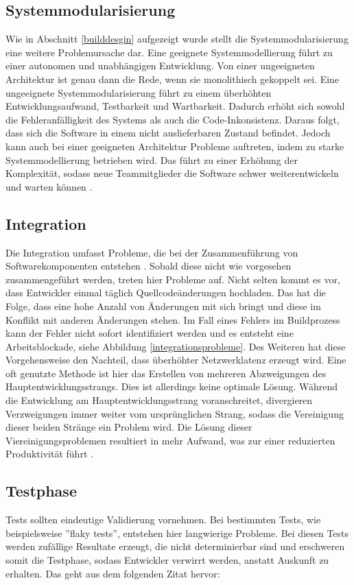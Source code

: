 \subsection{Systemmodularisierung}  \label{Systemmodularisierung}
Wie in Abschnitt \ref{builddesgin} aufgezeigt wurde stellt die Systemmodularisierung eine weitere Problemursache dar. Eine geeignete Systemmodellierung führt zu einer autonomen und unabhängigen Entwicklung. Von einer ungeeigneten Architektur ist genau dann die Rede, wenn sie monolithisch gekoppelt sei. Eine ungeeignete Systemmodularisierung führt zu einem überhöhten Entwicklungsaufwand, Testbarkeit und Wartbarkeit. Dadurch erhöht sich sowohl die Fehleranfälligkeit des Systems als auch die Code-Inkonsistenz. Daraus folgt, dass sich die Software in einem nicht auslieferbaren Zustand befindet. Jedoch kann auch bei einer geeigneten Architektur Probleme auftreten, indem zu starke Systemmodellierung betrieben wird. Das führt zu einer Erhöhung der Komplexität, sodass neue Teammitglieder die Software schwer weiterentwickeln und warten können \cite{Laukkanen.2017}. 

\subsection{Integration} \label{Integration}
Die Integration umfasst Probleme, die bei der Zusammenführung von Softwarekomponenten entstehen \cite{LianpingEtPaddy.2015}. Sobald diese nicht wie vorgesehen zusammengeführt werden, treten hier Probleme auf. Nicht selten kommt es vor, dass Entwickler einmal täglich Quellcodeänderungen hochladen. Das hat die Folge, dass eine hohe Anzahl von Änderungen mit sich bringt und diese im Konflikt mit anderen Änderungen stehen. Im Fall eines Fehlers im Buildprozess kann der Fehler nicht sofort identifiziert werden und es entsteht eine Arbeitsblockade, siehe Abbildung \ref{integrationsprobleme}. Des Weiteren hat diese Vorgehensweise den Nachteil, dass überhöhter Netzwerklatenz erzeugt wird. Eine oft genutzte Methode ist hier das Erstellen von mehreren Abzweigungen des Hauptentwicklungsstrangs. Dies ist allerdings keine optimale Lösung. Während die Entwicklung am Hauptentwicklungsstrang voranschreitet, divergieren Verzweigungen immer weiter vom ursprünglichen Strang, sodass die Vereinigung dieser beiden Stränge ein Problem wird. Die Lösung dieser Viereinigungsproblemen resultiert in mehr Aufwand, was zur einer reduzierten Produktivität führt \cite{Laukkanen.2017}. 

\subsection{Testphase}
Tests sollten eindeutige Validierung vornehmen. Bei bestimmten Tests, wie beispielsweise ''flaky tests'', entstehen hier langwierige Probleme. Bei diesen Tests werden zufällige Resultate erzeugt, die nicht determinierbar sind und erschweren somit die Testphase, sodass Entwickler verwirrt werden, anstatt Auskunft zu erhalten. Das geht aus dem folgenden Zitat hervor: 

